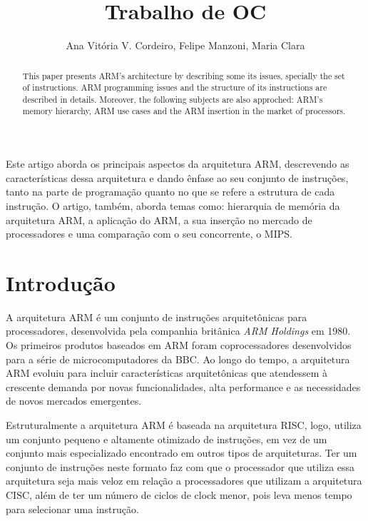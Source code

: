 \documentclass[12pt]{article}
\title{Trabalho de OC}
\author{Ana Vitória V. Cordeiro, Felipe Manzoni, Maria Clara}
\begin{document}
 

\maketitle

\maketitle
\begin{abstract}
	This paper presents ARM's architecture by describing some its issues,  specially the set of instructions.  ARM programming issues and the structure of its instructions are described in details. Moreover, the following subjects are also approched: ARM's memory hierarchy, ARM use cases and the ARM insertion in the market of processors. 
\end{abstract}

\begin{resumo} 
	Este artigo aborda os principais aspectos da arquitetura ARM, descrevendo as características dessa arquitetura e dando ênfase ao seu conjunto de instruções, tanto na parte de programação quanto no que se refere a estrutura de cada instrução. O artigo, também, aborda temas como: hierarquia de memória da arquitetura ARM, a aplicação do ARM, a sua inserção no mercado de processadores e uma comparação com o seu concorrente, o MIPS.
\end{resumo}

\section{Introdução}

A arquitetura ARM é um conjunto de instruções arquitetônicas para processadores, desenvolvida pela companhia britânica \textit{ARM Holdings} em 1980. Os primeiros produtos baseados em ARM foram coprocessadores desenvolvidos para a série de  microcomputadores da BBC. Ao longo do tempo, a arquitetura ARM evoluiu para incluir características arquitetônicas que atendessem à crescente demanda por novas funcionalidades, alta performance e as necessidades de novos mercados emergentes.

Estruturalmente a arquitetura ARM é baseada na arquitetura RISC, logo, utiliza um conjunto pequeno e altamente otimizado de instruções, em vez de um conjunto mais especializado encontrado em outros tipos de arquiteturas. Ter um conjunto de instruções neste formato faz com que o processador que utiliza essa arquitetura seja mais veloz em relação a processadores que utilizam a arquitetura CISC, além de ter um número de ciclos de clock menor, pois leva menos tempo para selecionar uma instrução.
\end{document}

